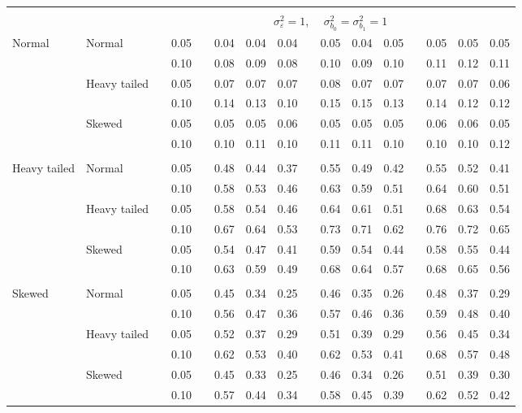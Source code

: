 \documentclass{article} %
\begin{document}
\begin{table}[ht]
\begin{scriptsize}
\begin{center}
\begin{tabular}{ll p{.1cm} c p{.1cm} rrr p{.1cm} rrr p{.1cm} rrr}
&&&&&&&&&&&&&&&\\
& && && \multicolumn{9}{c}{$\sigma_{\varepsilon}^2 = 1$, \ \ $\sigma_{b_0}^2 = \sigma_{b_1}^2 = 1$} \\ \cline{6-16}
\rowcolor{gray!20}Normal       & Normal       && 0.05 &&   0.04 & 0.04 & 0.04 && 0.05 & 0.04 & 0.05 && 0.05 & 0.05 & 0.05 \\
\rowcolor{gray!20}             &              && 0.10 &&   0.08 & 0.09 & 0.08 && 0.10 & 0.09 & 0.10 && 0.11 & 0.12 & 0.11 \\
\rowcolor{gray!20}             & Heavy tailed && 0.05 &&   0.07 & 0.07 & 0.07 && 0.08 & 0.07 & 0.07 && 0.07 & 0.07 & 0.06 \\
\rowcolor{gray!20}             &              && 0.10 &&   0.14 & 0.13 & 0.10 && 0.15 & 0.15 & 0.13 && 0.14 & 0.12 & 0.12 \\
\rowcolor{gray!20}             & Skewed       && 0.05 &&   0.05 & 0.05 & 0.06 && 0.05 & 0.05 & 0.05 && 0.06 & 0.06 & 0.05 \\
\rowcolor{gray!20}             &              && 0.10 &&   0.10 & 0.11 & 0.10 && 0.11 & 0.11 & 0.10 && 0.10 & 0.10 & 0.12 \\
             &&&&&&&&&&&&&&&\\
Heavy tailed & Normal       && 0.05 &&   0.48 & 0.44 & 0.37 && 0.55 & 0.49 & 0.42 && 0.55 & 0.52 & 0.41 \\
             &              && 0.10 &&   0.58 & 0.53 & 0.46 && 0.63 & 0.59 & 0.51 && 0.64 & 0.60 & 0.51 \\
             & Heavy tailed && 0.05 &&   0.58 & 0.54 & 0.46 && 0.64 & 0.61 & 0.51 && 0.68 & 0.63 & 0.54 \\
             &              && 0.10 &&   0.67 & 0.64 & 0.53 && 0.73 & 0.71 & 0.62 && 0.76 & 0.72 & 0.65 \\
             & Skewed       && 0.05 &&   0.54 & 0.47 & 0.41 && 0.59 & 0.54 & 0.44 && 0.58 & 0.55 & 0.44 \\
             &              && 0.10 &&   0.63 & 0.59 & 0.49 && 0.68 & 0.64 & 0.57 && 0.68 & 0.65 & 0.56 \\
             &&&&&&&&&&&&&&&\\
Skewed       & Normal       && 0.05 &&   0.45 & 0.34 & 0.25 && 0.46 & 0.35 & 0.26 &&  0.48 & 0.37 & 0.29 \\
             &              && 0.10 &&   0.56 & 0.47 & 0.36 && 0.57 & 0.46 & 0.36 &&  0.59 & 0.48 & 0.40 \\
             & Heavy tailed && 0.05 &&   0.52 & 0.37 & 0.29 && 0.51 & 0.39 & 0.29 &&  0.56 & 0.45 & 0.34 \\
             &              && 0.10 &&   0.62 & 0.53 & 0.40 && 0.62 & 0.53 & 0.41 &&  0.68 & 0.57 & 0.48 \\
             & Skewed       && 0.05 &&   0.45 & 0.33 & 0.25 && 0.46 & 0.34 & 0.26 &&  0.51 & 0.39 & 0.30 \\
             &              && 0.10 &&   0.57 & 0.44 & 0.34 && 0.58 & 0.45 & 0.39 &&  0.62 & 0.52 & 0.42 \\



\end{tabular}
\end{center}
\end{scriptsize}
\end{table}
\end{document}
